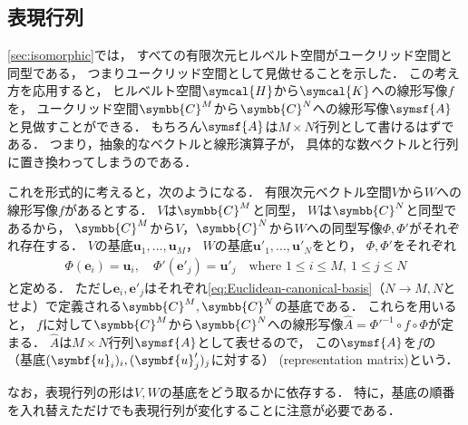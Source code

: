 \documentclass[
]{sotsu}
\begin{document}
\subsection{表現行列}
\label{sec:representation-matrix}

\cref{sec:isomorphic}では，
すべての有限次元ヒルベルト空間がユークリッド空間と同型である，
つまりユークリッド空間として見做せることを示した．
この考え方を応用すると，
ヒルベルト空間$\symcal{H}$から$\symcal{K}$への線形写像$f$を，
ユークリッド空間$\symbb{C}^M$から$\symbb{C}^N$への線形写像$\symsf{A}$と見做すことができる．
もちろん$\symsf{A}$は$M \times N$行列として書けるはずである．
つまり，抽象的なベクトルと線形演算子が，
具体的な数ベクトルと行列に置き換わってしまうのである．



\quad 
これを形式的に考えると，次のようになる．
有限次元ベクトル空間$V$から$W$への線形写像$f$があるとする．
$V$は$\symbb{C}^M$と同型，
$W$は$\symbb{C}^N$と同型であるから，
$\symbb{C}^M$から$V$，$\symbb{C}^N$から$W$への同型写像$\Phi, \Phi'$がそれぞれ存在する．
$V$の基底$\symbf{u}_1, \dots, \symbf{u}_M$，
$W$の基底$\symbf{u}'_1, \dots, \symbf{u}'_N$をとり，
$\Phi, \Phi'$をそれぞれ
\begin{align*}
    \Phi(\symbf{e}_i) = \symbf{u}_i,
    \quad 
    \Phi'(\symbf{e}'_j) = \symbf{u}'_j
    \quad 
    \text{where }
    1 \leq i \leq M, \  
    1 \leq j \leq N
\end{align*}
と定める．
ただし$\symbf{e}_i, \symbf{e}'_j$はそれぞれ\cref{eq:Euclidean-canonical-basis}（$N \to M, N$とせよ）で定義される$\symbb{C}^M, \symbb{C}^N$の基底である．
これらを用いると，
$f$に対して$\symbb{C}^M$から$\symbb{C}^N$への線形写像$\hat{A} = \Phi'^{-1} \circ f \circ \Phi$が定まる．
$\hat{A}$は$M \times N$行列$\symsf{A}$として表せるので，
この$\symsf{A}$を$f$の
（基底$\sequ{\symbf{u}_i}[i], \sequ{\symbf{u}'_j}[j]$に対する）
(representation matrix)という．

なお，表現行列の形は$V, W$の基底をどう取るかに依存する．
特に，基底の順番を入れ替えただけでも表現行列が変化することに注意が必要である．
\end{document}
